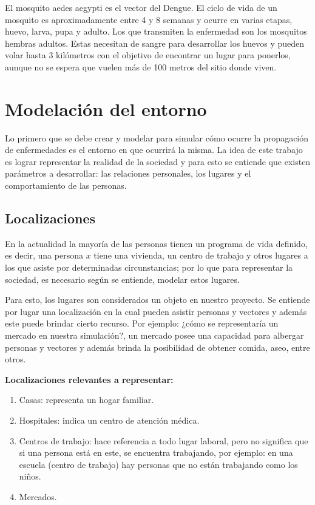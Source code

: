 El mosquito aedes aegypti es el vector del Dengue. El ciclo de vida de un mosquito es aproximadamente entre 4 y 
8 semanas y ocurre en varias etapas, huevo, larva, pupa y adulto. Los que transmiten la enfermedad son los mosquitos
hembras adultos. Estas necesitan de sangre para desarrollar los huevos y pueden volar hasta 3 kilómetros con 
el objetivo de encontrar un lugar para ponerlos, aunque no se espera que vuelen más de 100 metros del sitio 
donde viven.

\section{Modelación del entorno}
Lo primero que se debe crear y modelar para simular cómo ocurre la propagación de enfermedades es el 
entorno en que ocurrirá la misma. La idea de este trabajo es lograr representar la realidad de la sociedad
y para esto se entiende que existen parámetros a desarrollar: las relaciones personales, los lugares y el comportamiento
de las personas.

\subsection{Localizaciones}
En la actualidad la mayoría de las personas tienen un programa de vida definido, es decir, una persona $x$ tiene una 
vivienda, un centro de trabajo y otros lugares a los que asiste por determinadas circunstancias; por lo que
para representar la sociedad, es necesario según se entiende, modelar estos lugares.

Para esto, los lugares son considerados un objeto en nuestro proyecto. Se entiende por lugar una localización en
la cual pueden asistir personas y vectores y además este puede brindar cierto recurso. Por ejemplo: ¿cómo se
representaría un mercado en nuestra simulación?, un mercado posee una capacidad para albergar personas y vectores 
y además brinda la posibilidad de obtener comida, aseo, entre otros.

\textbf{Localizaciones relevantes a representar:}
\begin{enumerate}
    \item Casas: representa un hogar familiar.
    \item Hospitales: indica un centro de atención médica.
    \item Centros de trabajo: hace referencia a todo lugar laboral, pero no significa que si una persona está en este, se encuentra trabajando, por ejemplo: en una escuela (centro de trabajo) hay personas que no están trabajando como los niños.
    \item Mercados.
\end{enumerate}

